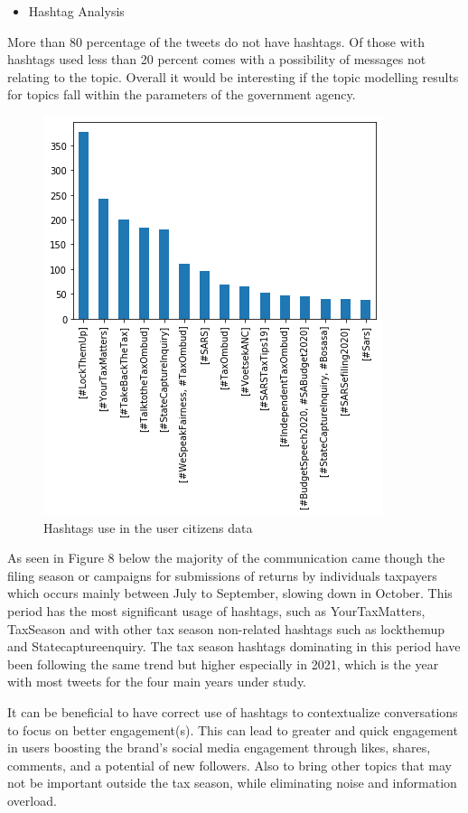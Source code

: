 \begin{itemize}
    \item Hashtag Analysis
\end{itemize}

More than 80 percentage of the tweets do not have hashtags.  Of those with hashtags used less than 20 percent comes with a possibility of messages not relating to the topic. Overall it would be interesting if the topic modelling results for topics fall within the parameters of the  government agency.

\begin{figure}
    \centering
    \includegraphics[width=0.4\linewidth]{postgrad_template 2/chapters/chapter1/Hashtags Used Second Data .png}
    \caption{Hashtags use in the user citizens data}
    \label{fig:enter-label}
\end{figure}

As seen in Figure 8 below the majority of the communication came though the filing season or campaigns for submissions of returns by individuals taxpayers which occurs mainly between July to September, slowing down in October. This period has the most significant usage of hashtags, such as YourTaxMatters, TaxSeason and with other tax season non-related hashtags such as lockthemup and Statecaptureenquiry.  The tax season hashtags dominating in this period have been following the same trend but higher especially in 2021, which is the year with most tweets for the four main years under study. 

\cite{alsini2021hashtag} It can be beneficial to have correct use of hashtags to contextualize conversations to focus on better engagement(s).  This can lead to greater and quick engagement in users boosting the brand’s social media engagement through likes, shares, comments, and a potential of new followers. Also to bring other topics that may not be important outside the tax season, while eliminating noise and information overload.

